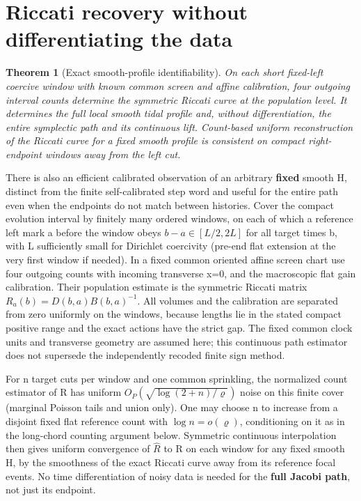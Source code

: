 \documentclass[11pt]{article}
\newtheorem{theorem}{Theorem}
\begin{document}
\section{Riccati recovery without differentiating the data}\label{sec:riccati}
\begin{theorem}[Exact smooth-profile identifiability]\label{thm:riccati}
On each short fixed-left coercive window with known common screen
and affine calibration, four outgoing interval counts determine
the symmetric Riccati curve at the population level. It determines
the full local smooth tidal profile and, without differentiation,
the entire symplectic path and its continuous lift. Count-based
uniform reconstruction of the Riccati curve for a fixed smooth
profile is consistent on compact right-endpoint windows away from
the left cut.
\end{theorem}
There is also an efficient calibrated observation of an arbitrary \textbf{fixed} smooth H, distinct from the finite self-calibrated step word and useful for the entire path even when the endpoints do not match between histories. Cover the compact evolution interval by finitely many ordered windows, on each of which a reference left mark a before the window obeys \(b-a\in[L/2,2L]\) for all target times b, with L sufficiently small for Dirichlet coercivity (pre-end flat extension at the very first window if needed). In a fixed common oriented affine screen chart use four outgoing counts with incoming transverse x=0, and the macroscopic flat gain calibration. Their population estimate is the symmetric Riccati matrix \(R_a(b)=D(b,a)B(b,a)^{-1}\). All volumes and the calibration are separated from zero uniformly on the windows, because lengths lie in the stated compact positive range and the exact actions have the strict gap. The fixed common clock units and transverse geometry are assumed here; this continuous path estimator does not supersede the independently recoded finite sign method.

For n target cuts per window and one common sprinkling, the normalized count estimator of R has uniform \(O_P(\sqrt{\log(2+n)/\varrho})\) noise on this finite cover (marginal Poisson tails and union only). One may choose n to increase from a disjoint fixed flat reference count with \(\log n=o(\varrho)\), conditioning on it as in the long-chord counting argument below. Symmetric continuous interpolation then gives uniform convergence of \(\widehat R\) to R on each window for any fixed smooth H, by the smoothness of the exact Riccati curve away from its reference focal events. No time differentiation of noisy data is needed for the \textbf{full Jacobi path}, not just its endpoint.
\end{document}
